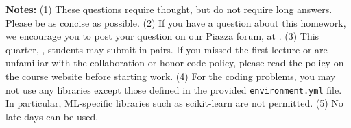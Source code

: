 {\bf Notes:} (1) These questions require thought, but do not require long
answers. Please be as concise as possible.  (2) If you have a question
about this homework, we encourage you to post your question on our
Piazza forum, at \piazza. (3) This quarter, \qtr, students may submit in pairs. If you
missed the first lecture or are unfamiliar with the collaboration or honor
code policy, please read the policy on the course website before starting work.
(4) For the coding problems, you may not
use any libraries except those defined in the provided \texttt{environment.yml}
file. In particular, ML-specific libraries such as scikit-learn are not
permitted. (5) No late days can be used.

